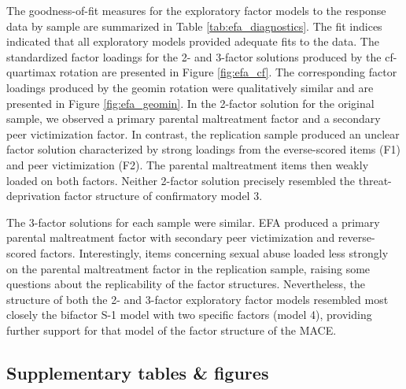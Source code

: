 \documentclass[letterpaper,man,natbib,noextraspace,floatsintext,longtable,12pt]{apa6}
\begin{document}
The goodness-of-fit measures for the exploratory factor models to the response data by sample are summarized in Table \ref{tab:efa_diagnostics}. The fit indices indicated that all exploratory models provided adequate fits to the data. The standardized factor loadings for the 2- and 3-factor solutions produced by the cf-quartimax rotation are presented in Figure \ref{fig:efa_cf}. The corresponding factor loadings produced by the geomin rotation were qualitatively similar and are presented in Figure \ref{fig:efa_geomin}. In the 2-factor solution for the original sample, we observed a primary parental maltreatment factor and a secondary peer victimization factor. In contrast, the replication sample produced an unclear factor solution characterized by strong loadings from the everse-scored items (F1) and peer victimization (F2). The parental maltreatment items then weakly loaded on both factors. Neither 2-factor solution precisely resembled the threat-deprivation factor structure of confirmatory model 3.

The 3-factor solutions for each sample were similar. EFA produced a primary parental maltreatment factor with secondary peer victimization and reverse-scored factors. Interestingly, items concerning sexual abuse loaded less strongly on the parental maltreatment factor in the replication sample, raising some questions about the replicability of the factor structures. Nevertheless, the structure of both the 2- and 3-factor exploratory factor models resembled most closely the bifactor S-1 model with two specific factors (model 4), providing further support for that model of the factor structure of the MACE. 

\pagebreak
\subsection*{Supplementary tables \& figures}
\end{document}
